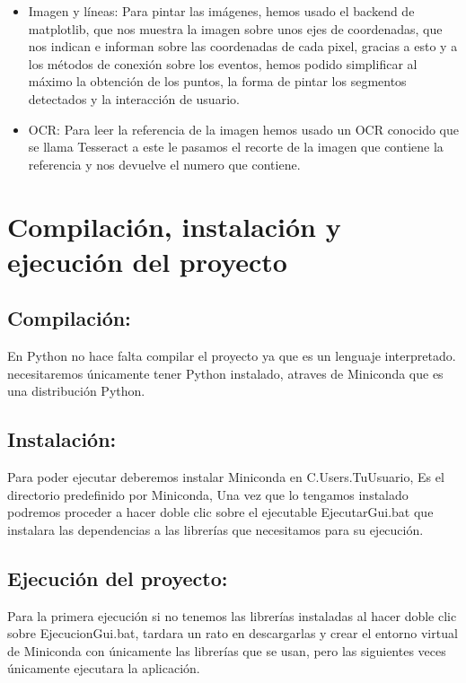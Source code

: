 \begin{itemize}
	\item Imagen y líneas: Para pintar las imágenes, hemos usado el backend de matplotlib, que nos muestra la imagen sobre unos ejes de coordenadas, que nos indican e informan sobre las coordenadas de cada pixel, gracias a esto y a los métodos de conexión sobre los eventos, hemos podido simplificar al máximo la obtención de los puntos, la forma de pintar los segmentos detectados y la interacción de usuario.
	
	\item OCR: Para leer la referencia de la imagen hemos usado un OCR conocido que se llama Tesseract a este le pasamos el recorte de la imagen que contiene la referencia y nos devuelve el numero que contiene.
\end{itemize}

\section{Compilación, instalación y ejecución del proyecto}

\subsection{Compilación:}
En Python no hace falta compilar el proyecto ya que es un lenguaje interpretado. necesitaremos únicamente tener Python instalado, atraves de Miniconda que es una distribución Python.

\subsection{Instalación:}
Para poder ejecutar deberemos instalar Miniconda en 
C.Users.TuUsuario, Es el directorio predefinido por Miniconda, Una vez que lo tengamos instalado podremos proceder a hacer doble clic sobre el ejecutable EjecutarGui.bat que instalara las dependencias a las librerías que necesitamos para su ejecución.

\subsection{Ejecución del proyecto:}
Para la primera ejecución si no tenemos las librerías instaladas al hacer doble clic sobre EjecucionGui.bat, tardara un rato en descargarlas y crear el entorno virtual de Miniconda con únicamente las librerías que se usan, pero las siguientes veces únicamente ejecutara la aplicación.

